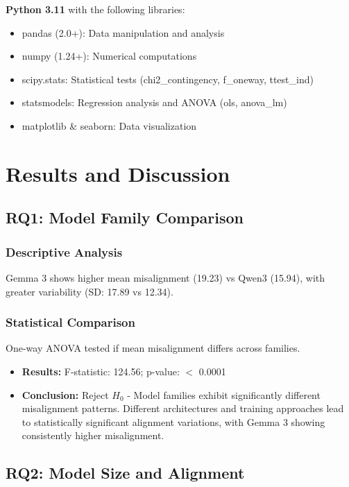 \documentclass{article}
\begin{document}
\textbf{Python 3.11} with the following libraries:
\begin{itemize}
    \item pandas (2.0+): Data manipulation and analysis
    \item numpy (1.24+): Numerical computations
    \item scipy.stats: Statistical tests (chi2\_contingency, f\_oneway, ttest\_ind)
    \item statsmodels: Regression analysis and ANOVA (ols, anova\_lm)
    \item matplotlib \& seaborn: Data visualization
\end{itemize}

\section{Results and Discussion}

\subsection{RQ1: Model Family Comparison}

\subsubsection{Descriptive Analysis}

Gemma 3 shows higher mean misalignment (19.23) vs Qwen3 (15.94), with greater variability (SD: 17.89 vs 12.34).

\subsubsection{Statistical Comparison}

One-way ANOVA tested if mean misalignment differs across families.

\begin{itemize}
\item \textbf{Results:} F-statistic: 124.56; p-value: $<$ 0.0001

\item \textbf{Conclusion:} Reject $H_0$ - Model families exhibit significantly different misalignment patterns. Different architectures and training approaches lead to statistically significant alignment variations, with Gemma 3 showing consistently higher misalignment.
\end{itemize}


\subsection{RQ2: Model Size and Alignment}
\end{document}
